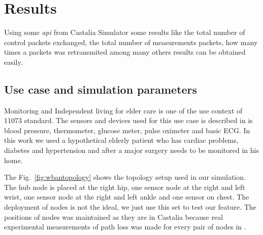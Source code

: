 \section{Results}
Using some \textit{api} from Castalia Simulator some results like the total number of control packets exchanged, the total number of measurements packets, how many times a packets was retransmited among many others results can be obtained easily.

\subsection{Use case and simulation parameters}

Monitoring and Independent living for elder care is one of the use context of 11073 standard. The sensors and devices used for this use case is described in \cite{b3} is blood pressure, thermometer, glucose meter, pulse oximeter and basic ECG. In this work we used a hypothetical elderly patient who has cardiac problems, diabetes and hypertension and  after a major surgery needs to be monitored in his home.

The Fig.~\ref{fig:wbantopology} shows the topology setup used in our simulation. The hub node is placed at the right hip, one sensor node at the right and left wrist, one sensor node at the right and left ankle and one sensor on chest. The deployment of nodes is not the ideal, we just use this set to test our feature. The positions of nodes was maintained as they are in Castalia because real experimental measurements of path loss was made for every pair of nodes in \cite{b4}.

